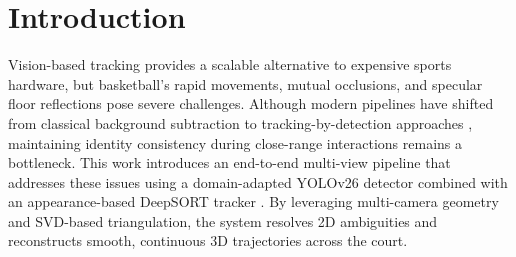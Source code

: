 \section{Introduction}\label{sec:intro}

Vision-based tracking provides a scalable alternative to expensive sports hardware, but basketball's rapid movements, mutual occlusions, and specular floor reflections pose severe challenges.
Although modern pipelines have shifted from classical background subtraction \cite{survey} to tracking-by-detection approaches \cite{sort}, maintaining identity consistency during close-range interactions remains a bottleneck.
This work introduces an end-to-end multi-view pipeline that addresses these issues using a domain-adapted YOLOv26 detector \cite{yolo_paper} combined with an appearance-based DeepSORT tracker \cite{deepsort,reid}.
By leveraging multi-camera geometry and SVD-based triangulation, the system resolves 2D ambiguities and reconstructs smooth, continuous 3D trajectories across the court.



